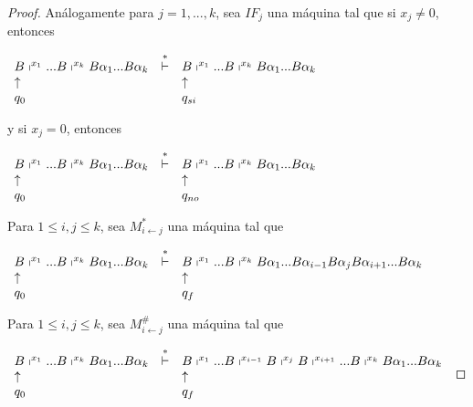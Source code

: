 \begin{lemma}
\begin{proof}
		\bigskip

	 	\noindent Análogamente para $j=1,...,k$, sea $IF_{j}$ una máquina tal que si $ x_{j}\neq 0$, entonces

		\bigskip

    $\displaystyle \begin{array}{lcl} B\shortmid ^{x_{1}}...B\shortmid ^{x_{k}}B\alpha _{1}...B\alpha _{k} &
    \overset{\ast }{\vdash } & B\shortmid ^{x_{1}}...B\shortmid ^{x_{k}}B\alpha _{1}...B\alpha _{k} \\
    \uparrow & & \uparrow \\ q_{0} & & q_{si} \end{array} $

		\bigskip

	  \noindent y si $x_{j}=0$, entonces

		\bigskip

    $\displaystyle \begin{array}{lcl} B\shortmid ^{x_{1}}...B\shortmid ^{x_{k}}B\alpha _{1}...B\alpha _{k} &
    \overset{\ast }{\vdash } & B\shortmid ^{x_{1}}...B\shortmid ^{x_{k}}B\alpha _{1}...B\alpha _{k} \\
    \uparrow & & \uparrow \\ q_{0} & & q_{no} \end{array} $

		\bigskip

	  \noindent Para $1\leq i,j\leq k$, sea $M_{i\leftarrow j}^{\ast }$ una máquina tal que

		\bigskip

    $\displaystyle \begin{array}{lcl} B\shortmid ^{x_{1}}...B\shortmid ^{x_{k}}B\alpha _{1}...B\alpha _{k} &
    \overset{\ast }{\vdash } & B\shortmid ^{x_{1}}...B\shortmid
    ^{x_{k}}B\alpha _{1}...B\alpha _{i-1}B\alpha _{j}B\alpha _{i+1}...B\alpha _{k} \\
    \uparrow & & \uparrow \\ q_{0} & & q_{f} \end{array} $

		\bigskip

    \noindent Para $1\leq i,j\leq k$, sea $M_{i\leftarrow j}^{\#}$ una máquina tal que

		\bigskip

    $\displaystyle \begin{array}{lcl} B\shortmid ^{x_{1}}...B\shortmid ^{x_{k}}B\alpha _{1}...B\alpha _{k} &
    \overset{\ast }{\vdash } & B\shortmid ^{x_{1}}...B\shortmid ^{x_{i-1}}B\shortmid ^{x_{j}}B\shortmid
    ^{x_{i+1}}...B\shortmid ^{x_{k}}B\alpha _{1}...B\alpha _{k} \\ \uparrow & & \uparrow \\ q_{0} & & q_{f} \end{array} $


\end{proof}
\end{lemma}
